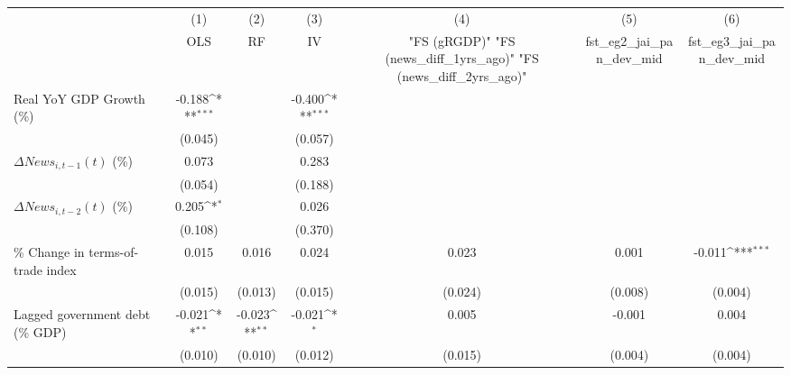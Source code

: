 {
\def\sym#1{\ifmmode^{#1}\else\(^{#1}\)\fi}
\begin{tabular}{l*{6}{c}}
\toprule
                    &\multicolumn{1}{c}{(1)}&\multicolumn{1}{c}{(2)}&\multicolumn{1}{c}{(3)}&\multicolumn{1}{c}{(4)}&\multicolumn{1}{c}{(5)}&\multicolumn{1}{c}{(6)}\\
                    &\multicolumn{1}{c}{OLS}&\multicolumn{1}{c}{RF}&\multicolumn{1}{c}{IV}&\multicolumn{1}{c}{ "FS (gRGDP)"  "FS (news_diff_1yrs_ago)"  "FS (news_diff_2yrs_ago)" }&\multicolumn{1}{c}{fst_eg2_jai_pan_dev_mid}&\multicolumn{1}{c}{fst_eg3_jai_pan_dev_mid}\\
\midrule
Real YoY GDP Growth (\%)&      -0.188\sym{***}&                     &      -0.400\sym{***}&                     &                     &                     \\
                    &     (0.045)         &                     &     (0.057)         &                     &                     &                     \\
\addlinespace
$ \Delta News_{i,t-1}(t)$ (\%)&       0.073         &                     &       0.283         &                     &                     &                     \\
                    &     (0.054)         &                     &     (0.188)         &                     &                     &                     \\
\addlinespace
$ \Delta News_{i,t-2}(t)$ (\%)&       0.205\sym{*}  &                     &       0.026         &                     &                     &                     \\
                    &     (0.108)         &                     &     (0.370)         &                     &                     &                     \\
\addlinespace
\% Change in terms-of-trade index&       0.015         &       0.016         &       0.024         &       0.023         &       0.001         &      -0.011\sym{***}\\
                    &     (0.015)         &     (0.013)         &     (0.015)         &     (0.024)         &     (0.008)         &     (0.004)         \\
\addlinespace
Lagged government debt (\% GDP)&      -0.021\sym{**} &      -0.023\sym{**} &      -0.021\sym{*}  &       0.005         &      -0.001         &       0.004         \\
                    &     (0.010)         &     (0.010)         &     (0.012)         &     (0.015)         &     (0.004)         &     (0.004)         \\

\end{tabular}}
